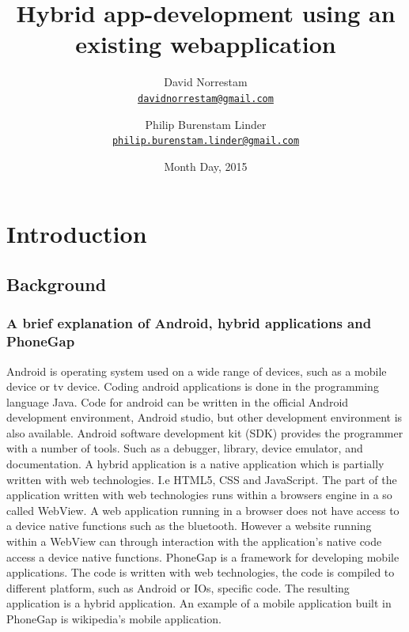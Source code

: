 \documentclass{./tex/cslthse-msc}
\author{
	David Norrestam \\
	{\normalsize \href{mailto:davidnorrestam@gmail.com}{\texttt{davidnorrestam@gmail.com}}}
	\and
	Philip Burenstam Linder \\
    {\normalsize \href{mailto:philip.burenstam.linder@gmail.com}{\texttt{philip.burenstam.linder@gmail.com}}}
}
\title{Hybrid app-development using an existing webapplication}
\date{Month Day, 2015}
\begin{document}
\makefrontmatter
\chapter{Introduction}
\section{Background}
\subsection{A brief explanation of Android, hybrid applications and PhoneGap}
Android is operating system used on a wide range of devices, such as a mobile device or tv device. Coding android applications is done in the programming language Java. Code for android can be written in the official Android development environment, Android studio, but other development environment is also available. 
\newline
\newline
Android software development kit (SDK) provides the programmer with a number of tools. Such as a debugger, library, device emulator, and documentation.  
\newline
\newline
A hybrid application is a native application which is partially written with web technologies. I.e HTML5, CSS and JavaScript. The part of the application written with web technologies runs within a browsers engine in a so called WebView. A web application running in a browser does not have access to a device native functions such as the bluetooth. However a website running within a WebView can through interaction with the application's native code access a device native functions.
\newline
\newline
PhoneGap is a framework for developing mobile applications. The code is written with web technologies, the code is compiled to different platform, such as Android or IOs, specific code. The resulting application is a hybrid application. An example of a mobile application built in PhoneGap is wikipedia's mobile application.  
\end{document}
